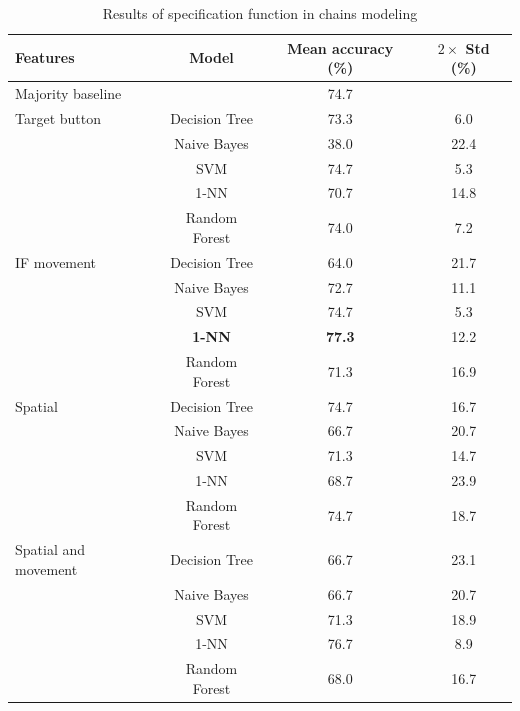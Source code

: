 \begin{table}[!htbp]
 \centering
\begin{tabular}{lccc}
\toprule
Features & Model    & Mean accuracy (\%) & $2\times$ Std (\%) \\
\midrule
 Majority baseline &   & 74.7	& \\
\midrule
Target button 	& Decision Tree 	& 73.3		& 6.0 	\\
				& Naive Bayes  	& 38.0		& 22.4	\\
				& SVM 			& 74.7		& 5.3 	\\
				& 1-NN			& 70.7		& 14.8 	\\
				& Random Forest	& 74.0		& 7.2	\\
\midrule
IF movement	& Decision Tree 	& 	64.0	& 21.7 \\
			& Naive Bayes  	&	72.7	& 11.1	\\
			& SVM 			&	74.7	& 5.3 	\\
			& \textbf{1-NN}			&	\textbf{77.3	} & 12.2 	\\
			& Random Forest	&	71.3	& 16.9 	\\
		
\midrule
Spatial	 	& Decision Tree 	& 74.7	& 16.7 \\
			& Naive Bayes  	& 66.7 	& 20.7	\\
			& SVM 			& 71.3	& 14.7 	\\
			& 1-NN			& 68.7	& 23.9 \\
			& Random Forest	& 74.7	& 18.7 \\	
\midrule
Spatial and movement& Decision Tree 	& 66.7	& 23.1 \\
					& Naive Bayes  	& 66.7	& 20.7	\\
					& SVM 			& 71.3	& 18.9 	\\
					& 1-NN			& 76.7	& 8.9 \\
					& Random Forest	& 68.0	& 16.7 \\			
\bottomrule
\end{tabular}
\caption{Results of specification function in chains modeling}
\label{tab:chains-ml-specification}
\end{table}

